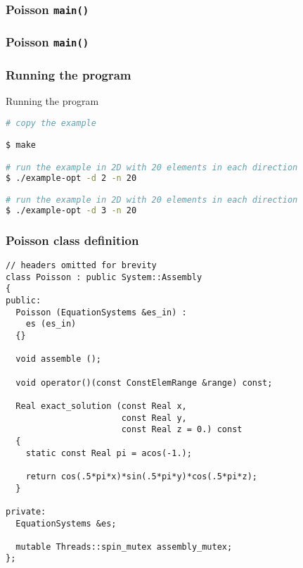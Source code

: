 \begin{frame}[allowframebreaks]
  \frametitle{Poisson \texttt{main()}}
  
\end{frame}


\begin{frame}[allowframebreaks]
  \frametitle{Poisson \texttt{main()}}
  
\end{frame}


\begin{frame}[fragile]
  \frametitle{Running the program}
    \begin{block}{Running the program}
    \begin{lstlisting}[language=bash]
# copy the example

$ make

# run the example in 2D with 20 elements in each direction
$ ./example-opt -d 2 -n 20 

# run the example in 2D with 20 elements in each direction
$ ./example-opt -d 3 -n 20 
    \end{lstlisting}
  \end{block}
\end{frame}

 

\frame
{
  \Large
  \begin{block}{}
  \end{block}
}



\begin{frame}
  \frametitle{Poisson class definition}

  \begin{lstlisting}
// headers omitted for brevity
class Poisson : public System::Assembly
{
public:
  Poisson (EquationSystems &es_in) :
    es (es_in)
  {}

  void assemble ();

  void operator()(const ConstElemRange &range) const;

  Real exact_solution (const Real x,
                       const Real y,
                       const Real z = 0.) const
  {
    static const Real pi = acos(-1.);

    return cos(.5*pi*x)*sin(.5*pi*y)*cos(.5*pi*z);
  }

private:
  EquationSystems &es;

  mutable Threads::spin_mutex assembly_mutex;
};
  \end{lstlisting}
\end{frame}



